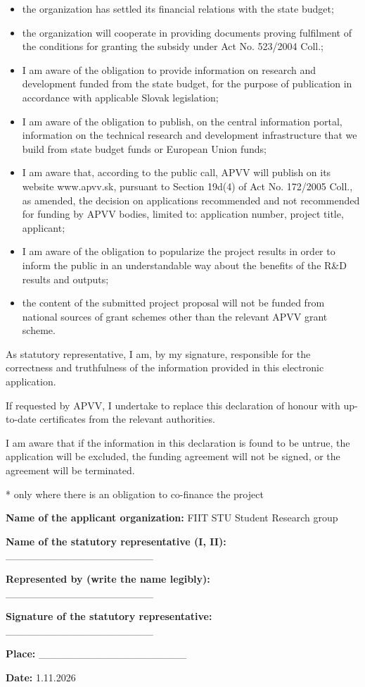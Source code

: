 \documentclass[10pt,a4paper]{article}
\begin{document}
\begin{itemize}
\item the organization has settled its financial relations with the state budget;
\item the organization will cooperate in providing documents proving fulfilment of the conditions for granting the subsidy under Act No. 523/2004 Coll.;
\item I am aware of the obligation to provide information on research and development funded from the state budget, for the purpose of publication in accordance with applicable Slovak legislation;
\item I am aware of the obligation to publish, on the central information portal, information on the technical research and development infrastructure that we build from state budget funds or European Union funds;
\item I am aware that, according to the public call, APVV will publish on its website www.apvv.sk, pursuant to Section 19d(4) of Act No. 172/2005 Coll., as amended, the decision on applications recommended and not recommended for funding by APVV bodies, limited to: application number, project title, applicant;
\item I am aware of the obligation to popularize the project results in order to inform the public in an understandable way about the benefits of the R\&D results and outputs;
\item the content of the submitted project proposal will not be funded from national sources of grant schemes other than the relevant APVV grant scheme.
\end{itemize}
As statutory representative, I am, by my signature, responsible for the correctness and truthfulness of the information provided in this electronic application.\par

If requested by APVV, I undertake to replace this declaration of honour with up-to-date certificates from the relevant authorities.\par

I am aware that if the information in this declaration is found to be untrue, the application will be excluded, the funding agreement will not be signed, or the agreement will be terminated.\par

* only where there is an obligation to co-finance the project\par

\noindent\textbf{ Name of the applicant organization:} FIIT STU Student Research group\par
\noindent\textbf{ Name of the statutory representative (I, II):} \_\_\_\_\_\_\_\_\_\_\_\_\_\_\_\_\_\_\_\_\par
\noindent\textbf{ Represented by (write the name legibly):} \_\_\_\_\_\_\_\_\_\_\_\_\_\_\_\_\_\_\_\_\par
\noindent\textbf{ Signature of the statutory representative:} \_\_\_\_\_\_\_\_\_\_\_\_\_\_\_\_\_\_\_\_\par
\noindent\textbf{ Place:} \_\_\_\_\_\_\_\_\_\_\_\_\_\_\_\_\_\_\_\_\par
\noindent\textbf{ Date:} 1.11.2026\par
\end{document}
